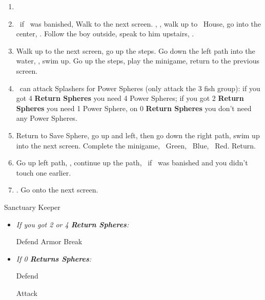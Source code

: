 \begin{enumerate}[resume]
    \item \formation{\tidus}{\kimahri}{\auron}
    \item \save\ if \bahamut\ was banished, Walk to the next screen. \skippablefmv[0:20], \sd, walk up to \tidus\ House, go into the center, \sd. Follow the boy outside, speak to him upstairs, \sd.
    \item Walk up to the next screen, go up the steps. Go down the left path into the water, \sd, swim up. Go up the steps, play the minigame, return to the previous screen.
    \item \tidus\ can attack Splashers for Power Spheres (only attack the 3 fish group): if you got 4 \textbf{Return Spheres} you need 4 Power Spheres; if you got 2 \textbf{Return Spheres} you need 1 Power Sphere, on 0 \textbf{Return Spheres} you don't need any Power Spheres.
    \item Return to Save Sphere, go up and left, then go down the right path, swim up into the next screen. Complete the minigame, \rikku\ Green, \tidus\ Blue, \wakka\ Red. Return.
    \item Go up left path, \sd, continue up the path, \save\ if \bahamut\ was banished and you didn't touch one earlier.
    \item \formation{\tidus}{\yuna}{\wakka}. Go onto the next screen.
\end{enumerate}
\begin{battle}[40000]{Sanctuary Keeper}
    \begin{itemize}
        \item \textit{If you got 2 or 4 \textbf{Return Spheres}:}
        \begin{itemize}
            \yunaf Defend
            \tidusf Armor Break
        \end{itemize}
        \item \textit{If 0 \textbf{Returns Spheres}:}
        \begin{itemize}
            \tidusf Defend
        \end{itemize}
        \summon{\bahamut}
        \bahamutf Attack
    \end{itemize}
\end{battle}
\winnpsingle\lossnpsingle
